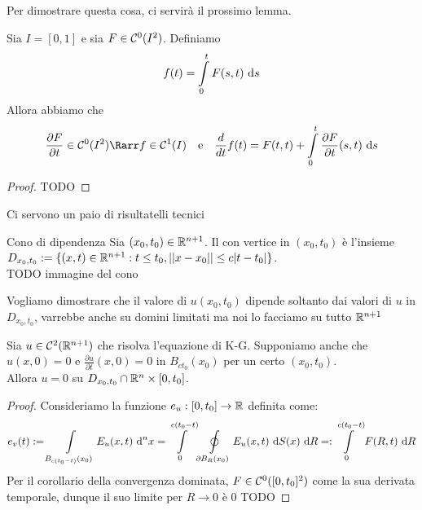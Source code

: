 \documentclass{book}
\begin{document}
Per dimostrare questa cosa, ci servirà il prossimo lemma.

\begin{lemma}{}{}
    Sia $I = [0,1]$ e sia $F \in \mathcal{C}^0(I^2)$. Definiamo
    \[f(t) = \int\limits_0^t F(s,t)\text{ d} s\]
    Allora abbiamo che 
    \[\frac{\partial F}{\partial t}\in \mc{C}^0(I^2)\Rarr f \in \mc{C}^1(I) \quad \text{e}\quad \frac{d}{dt}f(t) = F(t,t) + \int\limits_0^t \frac{\partial F}{\partial t}(s,t)\de s\]
\end{lemma}
\begin{proof}
    TODO
\end{proof}

Ci servono un paio di risultatelli tecnici

\begin{definition}{Cono di dipendenza}{}
    Sia $(x_0,t_0)\in \mathbb{R}^{n+1}$. Il  con vertice in $(x_0,t_0)$ è l'insieme $D_{x_0,t_0} := \{(x,t) \in \mathbb{R}^{n+1}: t\le t_0, ||x-x_0||\le c |t-t_0|\}$.\\
    TODO immagine del cono
\end{definition}

Vogliamo dimostrare che il valore di $u(x_0,t_0)$ dipende soltanto dai valori di $u$ in $D_{x_0,t_0}$, varrebbe anche su domini limitati ma noi lo facciamo su tutto $\mathbb{R}^{n+1}$

\begin{theorem}{}{}
    Sia $u \in \mathcal{C}^2(\mathbb{R}^{n+1})$ che risolva l'equazione di K-G. Supponiamo anche che $u(x,0) = 0$ e $\frac{\partial u}{\partial t} (x,0) = 0$ in $B_{ct_0}(x_0)$ per un certo $(x_0,t_0)$.\\
    Allora $u=0$ su $D_{x_0,t_0}\cap \mathbb{R}^n\times [0,t_0]$.
\end{theorem}
\begin{proof}
    Consideriamo la funzione $e_u : [0,t_0]\to \mathbb{R}$ definita come:
    \[e_v(t):= \int\limits_{B_{c(t_0-t)}(x_0)}E_u(x,t)\text{ d}^n x = \int\limits_0^{c(t_0-t)} \oint\limits\limits_{\partial B_R(x_0)} E_u(x,t)\text{ d} S(x)\text{ d} R =: \int\limits_0^{c(t_0-t)} F(R,t)\text{ d} R \]
    Per il corollario della convergenza dominata, $F \in \mathcal{C}^0([0,t_0]^2)$ come la sua derivata temporale, dunque il suo limite per $R\to 0$ è $0$
    TODO
\end{proof}
\end{document}
